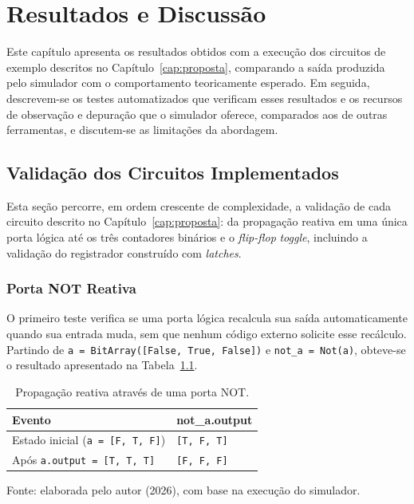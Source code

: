 \chapter{Resultados e Discussão}
\label{cap:resultados}

Este capítulo apresenta os resultados obtidos com a execução dos circuitos de exemplo descritos no Capítulo~\ref{cap:proposta}, comparando a saída produzida pelo simulador com o comportamento teoricamente esperado. Em seguida, descrevem-se os testes automatizados que verificam esses resultados e os recursos de observação e depuração que o simulador oferece, comparados aos de outras ferramentas, e discutem-se as limitações da abordagem.

\section{Validação dos Circuitos Implementados}
\label{sec:validacao}

Esta seção percorre, em ordem crescente de complexidade, a validação de cada circuito descrito no Capítulo~\ref{cap:proposta}: da propagação reativa em uma única porta lógica até os três contadores binários e o \textit{flip-flop} \textit{toggle}, incluindo a validação do registrador construído com \textit{latches}.

\subsection{Porta NOT Reativa}

O primeiro teste verifica se uma porta lógica recalcula sua saída automaticamente quando sua entrada muda, sem que nenhum código externo solicite esse recálculo. Partindo de \texttt{a = BitArray([False, True, False])} e \texttt{not\_a = Not(a)}, obteve-se o resultado apresentado na Tabela~\ref{tab:not}.

\begin{table}[H]
\centering
\caption{Propagação reativa através de uma porta NOT.}
\label{tab:not}
\begin{tabular}{l|l}
\hline
\textbf{Evento} & \textbf{not\_a.output} \\
\hline
Estado inicial (\texttt{a = [F, T, F]}) & \texttt{[T, F, T]} \\
Após \texttt{a.output = [T, T, T]} & \texttt{[F, F, F]} \\
\hline
\end{tabular}
\begin{center}
\footnotesize Fonte: elaborada pelo autor (2026), com base na execução do simulador.
\end{center}
\end{table}

